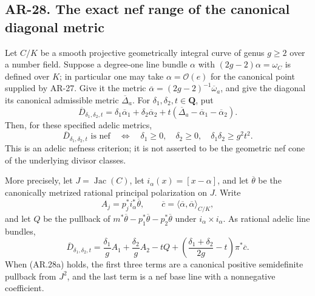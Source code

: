 \subsection*{AR-28. The exact nef range of the canonical diagonal metric}

\begin{proposition}[AR-28]
Let $C/K$ be a smooth projective geometrically integral curve of genus
$g\ge2$ over a number field.  Suppose a degree-one line bundle
$\alpha$ with $(2g-2)\alpha=\omega_C$ is defined over $K$;
in particular one may take $\alpha=\mathcal O(e)$ for the canonical
point supplied by AR-27.  Give it the metric
$\overline\alpha=(2g-2)^{-1}\overline\omega_a$, and give the
diagonal its canonical admissible metric $\overline\Delta_a$.
For $\delta_1,\delta_2,t\in\mathbf Q$, put
\[
 \overline D_{\delta_1,\delta_2,t}
 =\delta_1\overline\alpha_1+\delta_2\overline\alpha_2
       +t(\overline\Delta_a-\overline\alpha_1
                              -\overline\alpha_2).
\]
Then, for these specified adelic metrics,
\[
 \overline D_{\delta_1,\delta_2,t}\text{ is nef}
 \quad\Longleftrightarrow\quad
 \delta_1\ge0,\quad\delta_2\ge0,\quad
 \delta_1\delta_2\ge g^2t^2.                            \tag{AR.28a}
\]
This is an adelic nefness criterion; it is not asserted to be the
geometric nef cone of the underlying divisor classes.

More precisely, let $J=\operatorname{Jac}(C)$, let
$i_\alpha(x)=[x-\alpha]$, and let $\overline\theta$ be the
canonically metrized rational principal polarization on $J$.
Write
\[
 A_j=p_j^*i_\alpha^*\overline\theta,
 \qquad
 \overline c=\langle\overline\alpha,\overline\alpha\rangle_{C/K},
\]
and let $Q$ be the pullback of
$m^*\overline\theta-p_1^*\overline\theta-p_2^*\overline\theta$
under $i_\alpha\times i_\alpha$.  As rational adelic line bundles,
\[
 \overline D_{\delta_1,\delta_2,t}
   =\frac{\delta_1}{g}A_1+\frac{\delta_2}{g}A_2-tQ
      +\left(\frac{\delta_1+\delta_2}{2g}-t\right)\pi^*\overline c.
                                                               \tag{AR.28b}
\]
When (AR.28a) holds, the first three terms are a canonical positive
semidefinite pullback from $J^2$, and the last term is a nef base
line with a nonnegative coefficient.
\end{proposition}

